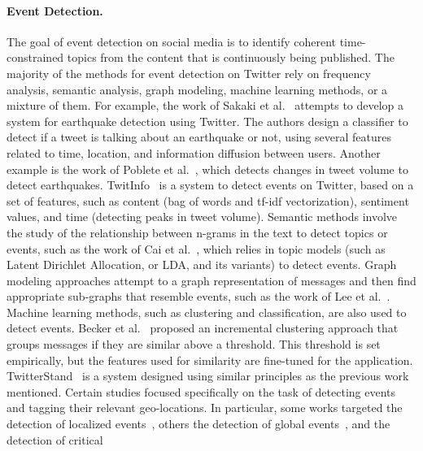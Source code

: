 \paragraph{Event Detection.} 
%
The goal of event detection on social media is to identify coherent
time-constrained topics from the content that is continuously being published.
%
The majority of the methods for event detection on Twitter rely on frequency
analysis, semantic analysis, graph modeling, machine learning methods, or a
mixture of them.
%
For example, the work of Sakaki et al.~\cite{Sakaki2010} attempts to develop a
system for earthquake detection using Twitter.
%
The authors design a classifier to detect if a tweet is talking about an
earthquake or not, using several features related to time, location, and
information diffusion between users.
%
Another example is the work of Poblete et al.~\cite{poblete2018robust}, which
detects changes in tweet volume to detect earthquakes.
%
TwitInfo~\cite{Marcus:2011:TAV:1978942.1978975} is a system to detect events on
Twitter, based on a set of features, such as content (bag of words and tf-idf
vectorization), sentiment values, and time (detecting peaks in tweet volume).
%
Semantic methods involve the study of the relationship between n-grams in the
text to detect topics or events, such as the work of Cai et
al.~\cite{cai2015popular}, which relies in topic models (such as Latent
Dirichlet Allocation, or LDA, and its variants) to detect events.
%
Graph modeling approaches attempt to a graph representation of messages
and then find appropriate sub-graphs that resemble events, such as the work of
Lee et al.~\cite{Lee:2013:KSK:2487575.2487711,Lee:2014:CCS:2661829.2661859}.
%
Machine learning methods, such as clustering and classification, are also used
to detect events.
%
Becker et al.~\cite{Becker:2010:LSM:1718487.1718524} proposed an incremental
clustering approach that groups messages if they are similar above a threshold.
%
This threshold is set empirically, but the features used for similarity are
fine-tuned for the application.
%
TwitterStand~\cite{Sankaranarayanan:2009:TNT:1653771.1653781} is a system
designed using similar principles as the previous work mentioned.
%
Certain studies focused specifically on the task of detecting events and tagging
their relevant geo-locations.  
%
In particular, some works targeted the detection of localized
events~\cite{Watanabe:Jasmine:2011,Abdelhaq:EvenTweet:2013,Walther:2013fb,Lee:A:2011,Krumm:2015},
others the detection of global events~\cite{sankaranarayanan:twitterstand:2009},
and the detection of critical

